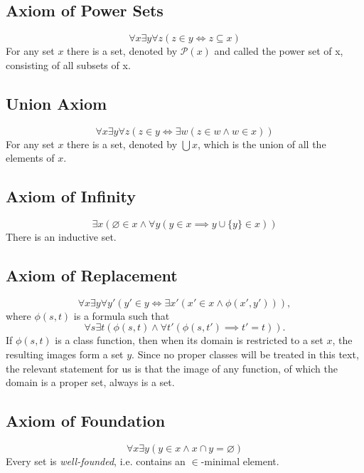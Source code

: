\documentclass[../../main.tex]{subfiles}
\begin{document}
\subsection{Axiom of Power Sets}
$$\forall x \exists y \forall z \left(z \in y \iff z \subseteq x\right)$$
For any set $x$ there is a set, denoted by $\mathcal{P}(x)$ and called the power set of x, consisting of all subsets of x.

\subsection{Union Axiom}
$$\forall x \exists y \forall z \left(z \in y \iff \exists w \left(z \in w \wedge w \in x\right)\right)$$
For any set $x$ there is a set, denoted by $\bigcup x$, which is the union of all the elements of $x$.

\subsection{Axiom of Infinity} \label{ZF7}
$$\exists x \left(\varnothing \in x \wedge \forall y \left(y \in x \implies y \cup \{y\} \in x \right)\right)$$
There is an inductive set.

\subsection{Axiom of Replacement}
$$\forall x \exists y \forall y' \left(y' \in y \iff \exists x' \left(x' \in x \wedge \phi(x', y')\right)\right),$$
where $\phi(s, t)$ is a formula such that 
$$\forall s \exists t \left(\phi(s, t) \wedge \forall t' \left(\phi(s, t') \implies t' = t\right)\right).$$
If $\phi(s, t)$ is a class function, then when its domain is restricted to a set $x$, the resulting images form a set $y$.
Since no proper classes will be treated in this text, the relevant statement for us is that the image of any function, of which the domain is a proper set, always is a set.

\subsection{Axiom of Foundation}
$$\forall x \exists y \left(y \in x \wedge x \cap y = \varnothing \right)$$
Every set is \textit{well-founded}, i.e. contains an $\in$-minimal element.
\end{document}
